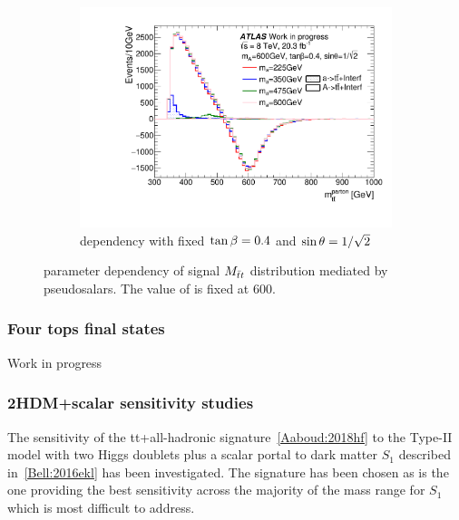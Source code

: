\begin{figure}
\begin{subfigure}[b]{0.49\textwidth}
\includegraphics[width=\textwidth]{texinputs/04_grid/figures/ttres/ttres_2HDMa_A_ma.pdf}
\caption{\ma dependency with fixed $\tan\beta=0.4$ and $\sin\theta=1/\sqrt{2}$}
\end{subfigure}
\caption{parameter dependency of signal $M_{\bar{t}t}$ distribution mediated by pseudosalars. The value of \mA is fixed at 600\GeV.}
\label{fig:ttres_2HDM_A}
\end{figure}
\FloatBarrier

\subsubsection{Four tops final states}

Work in progress

\subsubsection{2HDM+scalar sensitivity studies}

The sensitivity of the tt+\met all-hadronic signature~\ref{Aaboud:2018hf}
to the Type-II model with two Higgs doublets plus a 
scalar portal to dark matter $S_1$ described in~\ref{Bell:2016ekl} has been investigated.
The signature has been chosen as is the one providing the best sensitivity across the majority of the 
mass range for $S_1$ which is most difficult to address. 

